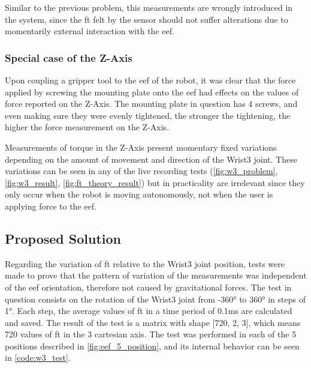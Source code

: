 \par Similar to the previous problem, this measurements are wrongly introduced in the system, since the \ac{ft} felt by the sensor should not suffer alterations due to momentarily external interaction with the \ac{eef}.

\subsubsection{Special case of the Z-Axis}

\par Upon coupling a gripper tool to the \ac{eef} of the robot, it was clear that the force applied by screwing the mounting plate onto the \ac{eef} had effects on the values of force reported on the Z-Axis. The mounting plate in question has 4 screws, and even making sure they were evenly tightened, the stronger the tightening, the higher the force measurement on the Z-Axis.

\par Measurements of torque in the Z-Axis present momentary fixed variations depending on the amount of movement and direction of the Wrist3 joint. These variations can be seen in any of the live recording tests (\autoref{fig:w3_problem}, \autoref{fig:w3_result}, \autoref{fig:ft_theory_result}) but in practicality are irrelevant since they only occur when the robot is moving autonomously, not when the user is applying force to the \ac{eef}.

\subsection{Proposed Solution}
\label{ssec:w3_solution}

\par Regarding the variation of \ac{ft} relative to the Wrist3 joint position, tests were made to prove that the pattern of variation of the measurements was independent of the \ac{eef} orientation, therefore not caused by gravitational forces. The test in question consists on the rotation of the Wrist3 joint from \ang{-360} to \ang{360} in steps of \ang{1}. Each step, the average values of \ac{ft} in a time period of 0.1ms are calculated and saved. The result of the test is a matrix with shape [720, 2, 3], which means 720 values of \ac{ft} in the 3 cartesian axis. The test was performed in each of the 5 positions described in \autoref{fig:eef_5_position}, and its internal behavior can be seen in \autoref{code:w3_test}.

